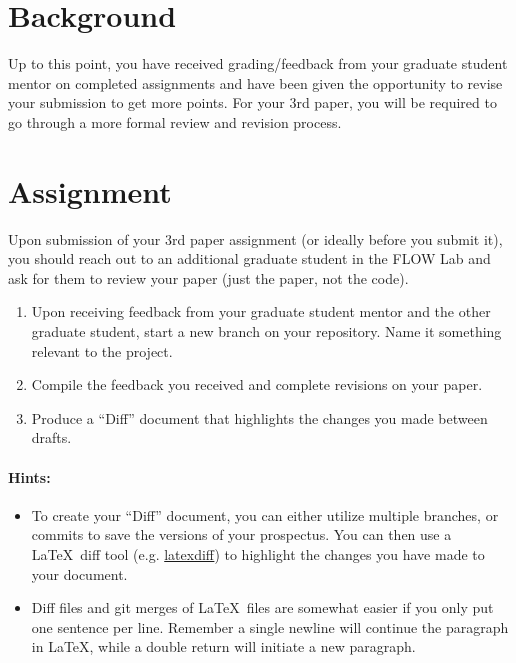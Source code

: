 \documentclass[12pt]{article}
\begin{document}

\section{Background}

Up to this point, you have received grading/feedback from your graduate student mentor on completed assignments and have been given the opportunity to revise your submission to get more points. For your 3rd paper, you will be required to go through a more formal review and revision process.  



\section{Assignment}



Upon submission of your 3rd paper assignment (or ideally before you submit it), you should reach out to an additional graduate student in the FLOW Lab and ask for them to review your paper (just the paper, not the code).

\begin{enumerate}
	\item Upon receiving feedback from your graduate student mentor and the other graduate student, start a new branch on your repository. Name it something relevant to the project. 
	\item Compile the feedback you received and complete revisions on your paper.
	\item Produce a ``Diff'' document that highlights the changes you made between drafts.
\end{enumerate}
	

\bigskip

\paragraph{Hints:}

\begin{itemize}
	\item To create your ``Diff'' document, you can either utilize multiple branches, or commits to save the versions of your prospectus.
	You can then use a \LaTeX~diff tool (e.g. \href{https://texblog.org/2018/08/14/track-changes-with-latexdiff/}{latexdiff}) to highlight the changes you have made to your document.
	\item Diff files and git merges of \LaTeX~files are somewhat easier if you only put one sentence per line.
	Remember a single newline will continue the paragraph in \LaTeX, while a double return will initiate a new paragraph.
\end{itemize}




	
	
\end{document}
